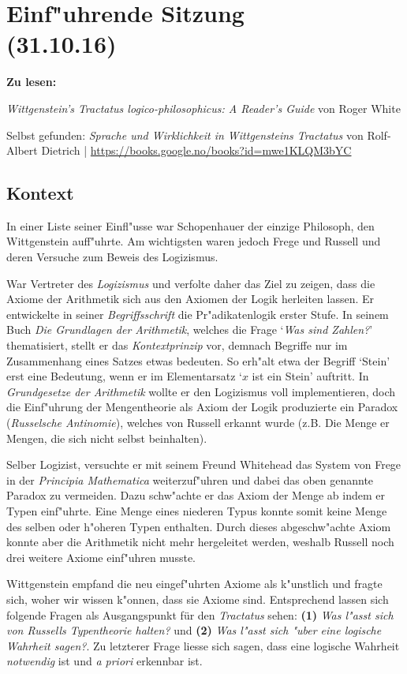 \documentclass[emulatestandardclasses]{scrartcl}
\begin{document}
\section{Einf"uhrende Sitzung\\(31.10.16)}

\textbf{Zu lesen:} 

\emph{Wittgenstein's Tractatus logico-philosophicus: A Reader's Guide} von Roger White

Selbst gefunden: 
\emph{Sprache und Wirklichkeit in Wittgensteins Tractatus} von Rolf-Albert Dietrich | \url{https://books.google.no/books?id=mwe1KLQM3bYC}

\subsection{Kontext}

In einer Liste seiner Einfl"usse war Schopenhauer der einzige Philosoph, den Wittgenstein auff"uhrte. Am wichtigsten waren jedoch Frege und Russell und deren Versuche zum Beweis des Logizismus.

\begin{description}[leftmargin=!,labelwidth=\widthof{\bfseries 2}]
  \item[Frege] War Vertreter des \emph{Logizismus} und verfolte daher das Ziel zu zeigen, dass die Axiome der Arithmetik sich aus den Axiomen der Logik herleiten lassen. Er entwickelte in seiner \emph{Begriffsschrift} die Pr"adikatenlogik erster Stufe. In seinem Buch \emph{Die Grundlagen der Arithmetik}, welches die Frage `\emph{Was sind Zahlen?}' thematisiert, stellt er das \emph{Kontextprinzip} vor, demnach Begriffe nur im Zusammenhang eines Satzes etwas bedeuten. So erh"alt etwa der Begriff `Stein' erst eine Bedeutung, wenn er im Elementarsatz `$x$ ist ein Stein' auftritt. In \emph{Grundgesetze der Arithmetik} wollte er den Logizismus voll implementieren, doch die Einf"uhrung der Mengentheorie als Axiom der Logik produzierte ein Paradox (\emph{Russelsche Antinomie}), welches von Russell erkannt wurde (z.B. Die Menge er Mengen, die sich nicht selbst beinhalten).
  \item[Russell] Selber Logizist, versuchte er mit seinem Freund Whitehead das System von Frege in der \emph{Principia Mathematica} weiterzuf"uhren und dabei das oben genannte Paradox zu vermeiden. Dazu schw"achte er das Axiom der Menge ab indem er Typen einf"uhrte. Eine Menge eines niederen Typus konnte somit keine Menge des selben oder h"oheren Typen enthalten. Durch dieses abgeschw"achte Axiom konnte aber die Arithmetik nicht mehr hergeleitet werden, weshalb Russell noch drei weitere Axiome einf"uhren musste.
  \item[Wittgensteins Einw"ande] Wittgenstein empfand die neu eingef"uhrten Axiome als k"unstlich und fragte sich, woher wir wissen k"onnen, dass sie Axiome sind. Entsprechend lassen sich folgende Fragen als Ausgangspunkt für den \emph{Tractatus} sehen: \textbf{(1)} \emph{Was l"asst sich von Russells Typentheorie halten?} und \textbf{(2)} \emph{Was l"asst sich "uber eine logische Wahrheit sagen?}. Zu letzterer Frage liesse sich sagen, dass eine logische Wahrheit \emph{notwendig} ist und \emph{a priori} erkennbar ist.
\end{description}
\end{document}
